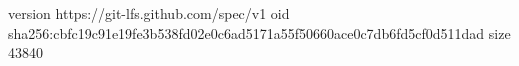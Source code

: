 version https://git-lfs.github.com/spec/v1
oid sha256:cbfc19c91e19fe3b538fd02e0c6ad5171a55f50660ace0c7db6fd5cf0d511dad
size 43840
